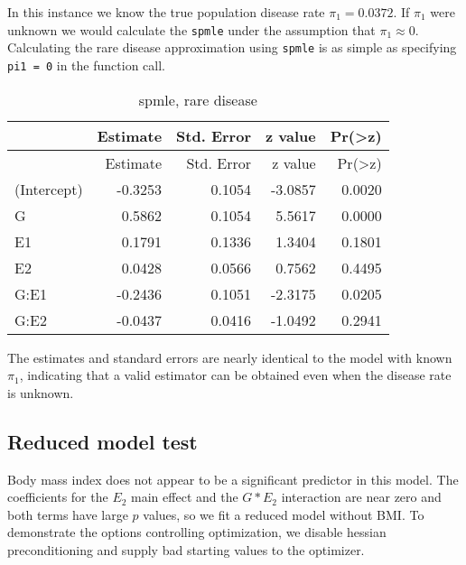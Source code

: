 \documentclass[11pt,]{article}
\newenvironment{Shaded}{\begin{snugshade}}{\end{snugshade}}
\newcommand{\KeywordTok}[1]{\textcolor[rgb]{0.13,0.29,0.53}{\textbf{#1}}}
\newcommand{\DataTypeTok}[1]{\textcolor[rgb]{0.13,0.29,0.53}{#1}}
\newcommand{\DecValTok}[1]{\textcolor[rgb]{0.00,0.00,0.81}{#1}}
\newcommand{\StringTok}[1]{\textcolor[rgb]{0.31,0.60,0.02}{#1}}
\newcommand{\OperatorTok}[1]{\textcolor[rgb]{0.81,0.36,0.00}{\textbf{#1}}}
\newcommand{\NormalTok}[1]{#1}
\begin{document}
In this instance we know the true population disease rate
\(\pi_1=0.0372\). If \(\pi_1\) were unknown we would calculate the
\texttt{spmle} under the assumption that \(\pi_1 \approx 0\).
Calculating the rare disease approximation using \texttt{spmle} is as
simple as specifying \texttt{pi1 = 0} in the function call.

\begin{Shaded}
\end{Shaded}

\begin{longtable}[]{@{}lrrrr@{}}
\caption{spmle, rare disease}\tabularnewline
\toprule
& Estimate & Std. Error & z value &
Pr(\textgreater{}\textbar{}z\textbar{})\tabularnewline
\midrule
\endfirsthead
\toprule
& Estimate & Std. Error & z value &
Pr(\textgreater{}\textbar{}z\textbar{})\tabularnewline
\midrule
\endhead
(Intercept) & -0.3253 & 0.1054 & -3.0857 & 0.0020\tabularnewline
G & 0.5862 & 0.1054 & 5.5617 & 0.0000\tabularnewline
E1 & 0.1791 & 0.1336 & 1.3404 & 0.1801\tabularnewline
E2 & 0.0428 & 0.0566 & 0.7562 & 0.4495\tabularnewline
G:E1 & -0.2436 & 0.1051 & -2.3175 & 0.0205\tabularnewline
G:E2 & -0.0437 & 0.0416 & -1.0492 & 0.2941\tabularnewline
\bottomrule
\end{longtable}

The estimates and standard errors are nearly identical to the model with
known \(\pi_1\), indicating that a valid estimator can be obtained even
when the disease rate is unknown.

\subsection{Reduced model test} \label{sec:spmle.reduced}

Body mass index does not appear to be a significant predictor in this
model. The coefficients for the \(E_2\) main effect and the \(G*E_2\)
interaction are near zero and both terms have large \(p\) values, so we
fit a reduced model without BMI. To demonstrate the options controlling
optimization, we disable hessian preconditioning and supply bad starting
values to the optimizer.
\end{document}
